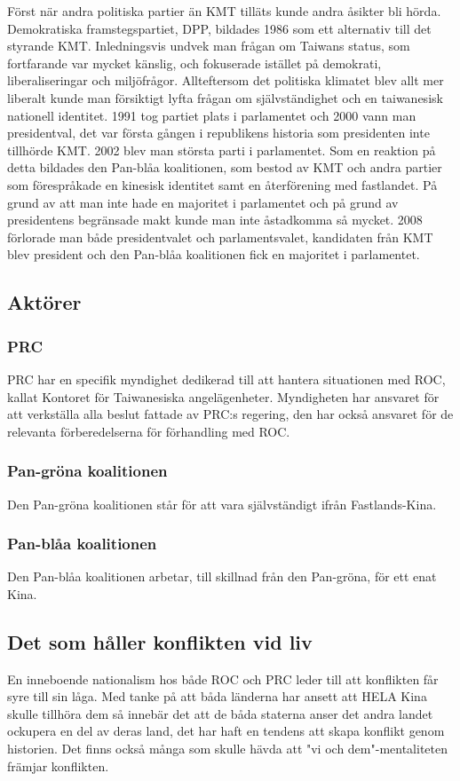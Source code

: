 \documentclass[a4paper,10pt]{article}
\begin{document}
Först när andra politiska partier än KMT tilläts kunde andra åsikter bli hörda. Demokratiska framstegspartiet, DPP, bildades 1986 som ett alternativ till det styrande KMT. Inledningsvis undvek man frågan om Taiwans status, som fortfarande var mycket känslig, och fokuserade istället på demokrati, liberaliseringar och miljöfrågor. Allteftersom det politiska klimatet blev allt mer liberalt kunde man försiktigt lyfta frågan om självständighet och en taiwanesisk nationell identitet. 1991 tog partiet plats i parlamentet och 2000 vann man presidentval, det var första gången i republikens historia som presidenten inte tillhörde KMT. 2002 blev man största parti i parlamentet. Som en reaktion på detta bildades den Pan-blåa koalitionen, som bestod av KMT och andra partier som förespråkade en kinesisk identitet samt en återförening med fastlandet. På grund av att man inte hade en majoritet i parlamentet och på grund av presidentens begränsade makt kunde man inte åstadkomma så mycket. 2008 förlorade man både presidentvalet och parlamentsvalet, kandidaten från KMT blev president och den Pan-blåa koalitionen fick en majoritet i parlamentet.


\subsection*{Aktörer}

\subsubsection*{PRC}
PRC har en specifik myndighet dedikerad till att hantera situationen med ROC, kallat Kontoret för Taiwanesiska angelägenheter. Myndigheten har ansvaret för att verkställa alla beslut fattade av PRC:s regering, den har också ansvaret för de relevanta förberedelserna för förhandling med ROC.

\subsubsection*{Pan-gröna koalitionen}
Den Pan-gröna koalitionen står för att vara självständigt ifrån Fastlands-Kina.

\subsubsection*{Pan-blåa koalitionen}
Den Pan-blåa koalitionen arbetar, till skillnad från den Pan-gröna, för ett enat Kina.

\subsection*{Det som håller konflikten vid liv}
En inneboende nationalism hos både ROC och PRC leder till att konflikten får syre till sin låga. Med tanke på att båda länderna har ansett att HELA Kina skulle tillhöra dem så innebär det att de båda staterna anser det andra landet ockupera en del av deras land, det har haft en tendens att skapa konflikt genom historien. Det finns också många som skulle hävda att "vi och dem"-mentaliteten främjar konflikten.
\end{document}
